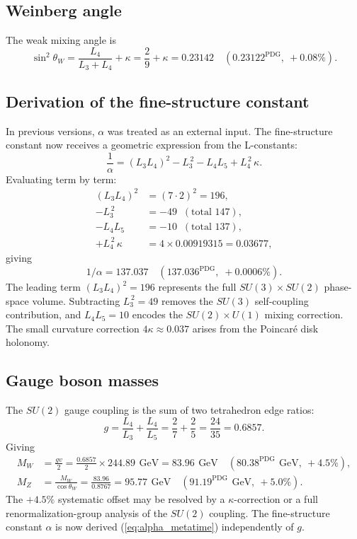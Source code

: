 \documentclass[aps,prd,reprint,twocolumn,showpacs,superscriptaddress]{revtex4-2}
\newcommand{\gev}{\,\text{GeV}}
\newcommand{\PDG}[1]{\ensuremath{#1^{\text{PDG}}}}
\begin{document}
\subsection{Weinberg angle}

The weak mixing angle is
\begin{equation}
\sin^2\theta_W = \frac{L_4}{L_3 + L_4} + \kappa
               = \frac{2}{9} + \kappa
               = 0.23142
               \quad (\PDG{0.23122},\ +0.08\%).
\end{equation}

\subsection{Derivation of the fine-structure constant}

In previous versions, $\alpha$ was treated as an external input.
The fine-structure constant now receives a geometric expression
from the L-constants:
\begin{equation}
\frac{1}{\alpha} = (L_3 L_4)^2 - L_3^{\,2} - L_4 L_5 + L_4^{\,2}\,\kappa.
\label{eq:alpha_metatime}
\end{equation}
Evaluating term by term:
\begin{align}
(L_3 L_4)^2 &= (7\cdot2)^2 = 196, \\
- L_3^{\,2} &= -49 \;\; (\text{total } 147), \\
- L_4 L_5 &= -10 \;\; (\text{total } 137), \\
+ L_4^{\,2}\,\kappa &= 4 \times 0.00919315 = 0.03677,
\end{align}
giving
\begin{equation}
1/\alpha = 137.037 \quad (\PDG{137.036},\; +0.0006\%).
\label{eq:alpha_value}
\end{equation}
The leading term $(L_3 L_4)^2 = 196$ represents the full
$SU(3)\times SU(2)$ phase-space volume.  Subtracting $L_3^{\,2}=49$
removes the $SU(3)$ self-coupling contribution, and
$L_4 L_5 = 10$ encodes the $SU(2)\times U(1)$ mixing correction.
The small curvature correction $4\kappa \approx 0.037$ arises
from the Poincar\'{e} disk holonomy.

\subsection{Gauge boson masses}

The $SU(2)$ gauge coupling is the sum of two tetrahedron edge ratios:
\begin{equation}
g = \frac{L_4}{L_3} + \frac{L_4}{L_5}
  = \frac{2}{7} + \frac{2}{5}
  = \frac{24}{35}
  = 0.6857.
\end{equation}
Giving
\begin{align}
M_W &= \frac{gv}{2}
     = \frac{0.6857}{2} \times 244.89\ \gev
     = 83.96\ \gev
     \quad (\PDG{80.38}\ \gev,\ +4.5\%), \\
M_Z &= \frac{M_W}{\cos\theta_W}
     = \frac{83.96}{0.8767}
     = 95.77\ \gev
     \quad (\PDG{91.19}\ \gev,\ +5.0\%).
\end{align}
The $+4.5\%$ systematic offset may be resolved by a $\kappa$-correction
or a full renormalization-group analysis of the $SU(2)$ coupling.
The fine-structure constant $\alpha$ is now derived
(\eqref{eq:alpha_metatime}) independently of $g$.
\end{document}
